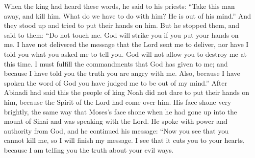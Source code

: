 When the king had heard these words, he said to his priests: ``Take this man away, and kill him. What do we have to do with him? He is out of his mind.''
\bverse \iffalse And they stood forth and attempted to lay their hands on him; but he withstood them, and said unto them: \fi
And they stood up and tried to put their hands on him. But he stopped them, and said to them:
\bverse \iffalse Touch me not, for God shall smite you if ye lay your hands upon me, for I have not delivered the message which the Lord sent me to deliver; neither have I told you that which ye requested that I should tell; therefore, God will not suffer that I shall be destroyed at this time. \fi
``Do not touch me. God will strike you if you put your hands on me. I have not delivered the message that the Lord sent me to deliver, nor have I told you what you asked me to tell you. God will not allow you to destroy me at this time.
\bverse \iffalse But I must fulfil the commandments wherewith God has commanded me; and because I have told you the truth ye are angry with me.  And again, because I have spoken the word of God ye have judged me that I am mad. \fi
I must fulfill the commandments that God has given to me; and because I have told you the truth you are angry with me. Also, because I have spoken the word of God you have judged me to be out of my mind.''
\bverse \iffalse Now it came to pass after Abinadi had spoken these words that the people of king Noah durst not lay their hands on him, for the Spirit of the Lord was upon him; and his face shone with exceeding luster, even as Moses' did while in the mount of Sinai, while speaking with the Lord. \fi
After Abinadi had said this the people of king Noah did not dare to put their hands on him, because the Spirit of the Lord had come over him. His face shone very brightly, the same way that Moses's face shone when he had gone up into the mount of Sinai and was speaking with the Lord.
\bverse \iffalse And he spake with power and authority from God; and he continued his words, saying: \fi
He spoke with power and authority from God, and he continued his message:
\bverse \iffalse Ye see that ye have not power to slay me, therefore I finish my message. Yea, and I perceive that it cuts you to your hearts because I tell you the truth concerning your iniquities. \fi
``Now you see that you cannot kill me, so I will finish my message. I see that it cuts you to your hearts, because I am telling you the truth about your evil ways.
\bverse \iffalse Yea, and my words fill you with wonder and amazement, and with anger. \fi
